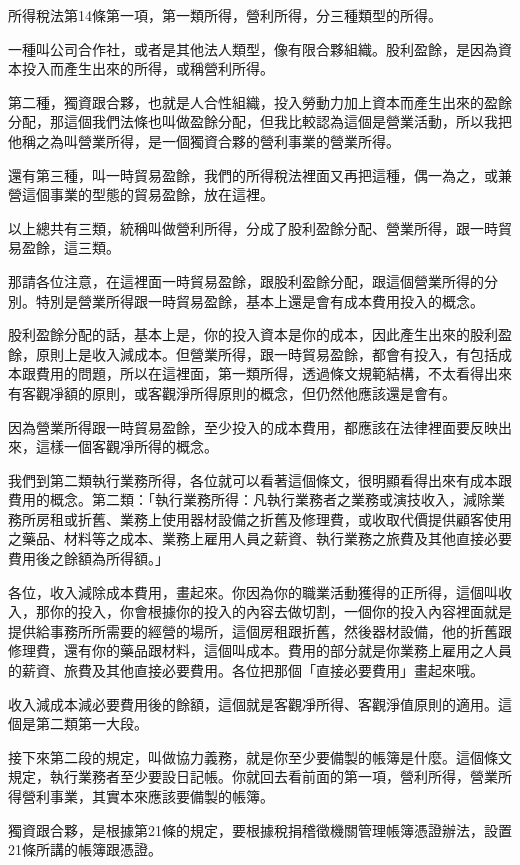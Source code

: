 \documentclass[oneside,sub3section]{ctexbook}
\begin{document}
所得稅法第14條第一項，第一類所得，營利所得，分三種類型的所得。

一種叫公司合作社，或者是其他法人類型，像有限合夥組織。股利盈餘，是因為資本投入而產生出來的所得，或稱營利所得。

第二種，獨資跟合夥，也就是人合性組織，投入勞動力加上資本而產生出來的盈餘分配，那這個我們法條也叫做盈餘分配，但我比較認為這個是營業活動，所以我把他稱之為叫營業所得，是一個獨資合夥的營利事業的營業所得。

還有第三種，叫一時貿易盈餘，我們的所得稅法裡面又再把這種，偶一為之，或兼營這個事業的型態的貿易盈餘，放在這裡。

以上總共有三類，統稱叫做營利所得，分成了股利盈餘分配、營業所得，跟一時貿易盈餘，這三類。

那請各位注意，在這裡面一時貿易盈餘，跟股利盈餘分配，跟這個營業所得的分別。特別是營業所得跟一時貿易盈餘，基本上還是會有成本費用投入的概念。

股利盈餘分配的話，基本上是，你的投入資本是你的成本，因此產生出來的股利盈餘，原則上是收入減成本。但營業所得，跟一時貿易盈餘，都會有投入，有包括成本跟費用的問題，所以在這裡面，第一類所得，透過條文規範結構，不太看得出來有客觀凈額的原則，或客觀淨所得原則的概念，但仍然他應該還是會有。

因為營業所得跟一時貿易盈餘，至少投入的成本費用，都應該在法律裡面要反映出來，這樣一個客觀凈所得的概念。

我們到第二類執行業務所得，各位就可以看著這個條文，很明顯看得出來有成本跟費用的概念。第二類：「執行業務所得：凡執行業務者之業務或演技收入，減除業務所房租或折舊、業務上使用器材設備之折舊及修理費，或收取代價提供顧客使用之藥品、材料等之成本、業務上雇用人員之薪資、執行業務之旅費及其他直接必要費用後之餘額為所得額。」

各位，收入減除成本費用，畫起來。你因為你的職業活動獲得的正所得，這個叫收入，那你的投入，你會根據你的投入的內容去做切割，一個你的投入內容裡面就是提供給事務所所需要的經營的場所，這個房租跟折舊，然後器材設備，他的折舊跟修理費，還有你的藥品跟材料，這個叫成本。費用的部分就是你業務上雇用之人員的薪資、旅費及其他直接必要費用。各位把那個「直接必要費用」畫起來哦。

收入減成本減必要費用後的餘額，這個就是客觀凈所得、客觀淨值原則的適用。這個是第二類第一大段。

接下來第二段的規定，叫做協力義務，就是你至少要備製的帳簿是什麼。這個條文規定，執行業務者至少要設日記帳。你就回去看前面的第一項，營利所得，營業所得營利事業，其實本來應該要備製的帳簿。

獨資跟合夥，是根據第21條的規定，要根據稅捐稽徵機關管理帳簿憑證辦法，設置21條所講的帳簿跟憑證。
\end{document}
